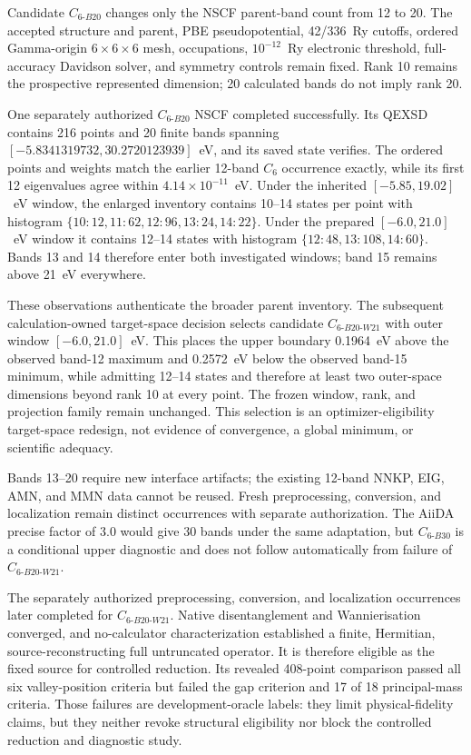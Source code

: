 \documentclass[11pt]{article}
\begin{document}
Candidate $C_{6\text{-}B20}$ changes only the NSCF parent-band count from 12 to 20.
The accepted structure and parent, PBE pseudopotential, 42/336~Ry cutoffs, ordered
Gamma-origin $6\times6\times6$ mesh, occupations, $10^{-12}$~Ry electronic threshold,
full-accuracy Davidson solver, and symmetry controls remain fixed.  Rank 10 remains the
prospective represented dimension; 20 calculated bands do not imply rank 20.

One separately authorized $C_{6\text{-}B20}$ NSCF completed successfully.  Its QEXSD
contains 216 points and 20 finite bands spanning $[-5.8341319732,30.2720123939]$~eV,
and its saved state verifies.  The ordered points and weights match the earlier
12-band $C_6$ occurrence exactly, while its first 12 eigenvalues agree within
$4.14\times10^{-11}$~eV.  Under the inherited $[-5.85,19.02]$~eV window, the enlarged
inventory contains 10--14 states per point with histogram
$\{10\!:\!12,11\!:\!62,12\!:\!96,13\!:\!24,14\!:\!22\}$.  Under the prepared
$[-6.0,21.0]$~eV window it contains 12--14 states with histogram
$\{12\!:\!48,13\!:\!108,14\!:\!60\}$.  Bands 13 and 14 therefore enter both
investigated windows; band 15 remains above 21~eV everywhere.

These observations authenticate the broader parent inventory.  The subsequent
calculation-owned target-space decision selects candidate
$C_{6\text{-}B20\text{-}W21}$ with outer window $[-6.0,21.0]$~eV.  This places the
upper boundary 0.1964~eV above the observed band-12 maximum and 0.2572~eV below the
observed band-15 minimum, while admitting 12--14 states and therefore at least two
outer-space dimensions beyond rank 10 at every point.  The frozen window, rank, and
projection family remain unchanged.  This selection is an optimizer-eligibility
target-space redesign, not evidence of convergence, a global minimum, or scientific
adequacy.

Bands 13--20 require new interface artifacts; the existing 12-band NNKP, EIG, AMN, and
MMN data cannot be reused.  Fresh preprocessing, conversion, and localization remain
distinct occurrences with separate authorization.  The AiiDA precise factor of 3.0
would give 30 bands under the same adaptation, but $C_{6\text{-}B30}$ is a conditional
upper diagnostic and does not follow automatically from failure of
$C_{6\text{-}B20\text{-}W21}$.

The separately authorized preprocessing, conversion, and localization occurrences later
completed for $C_{6\text{-}B20\text{-}W21}$.  Native disentanglement and
Wannierisation converged, and no-calculator characterization established a finite,
Hermitian, source-reconstructing full untruncated operator.  It is therefore eligible as
the fixed source for controlled reduction.  Its revealed 408-point comparison passed
all six valley-position criteria but failed the gap criterion and 17 of 18
principal-mass criteria.  Those failures are development-oracle labels: they limit
physical-fidelity claims, but they neither revoke structural eligibility nor block the
controlled reduction and diagnostic study.
\end{document}
